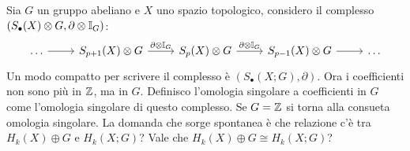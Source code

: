 \eproof
Sia $ G $ un gruppo abeliano e $ X $ uno spazio topologico, considero il complesso
$ (S_\bullet(X) \otimes G, \partial \otimes \mathbb{I}_{G}) $:
\[
  \begin{tikzcd}
    \dots \rar & S_{p+1}(X) \otimes G \rar{\partial \otimes \Id{G}} & S_p(X) \otimes G \rar{\partial \otimes \Id{G}} & S_{p-1}(X) \otimes G \rar & \dots
  \end{tikzcd}
\]
Un modo compatto per scrivere il complesso è $ (S_\bullet(X;G), \partial) $. Ora i
coefficienti non sono più in $ \mathbb{Z} $, ma in $ G $. Definisco l'omologia singolare
a coefficienti in $ G $ come l'omologia singolare di questo complesso. Se
$ G = \mathbb{Z} $ si torna alla consueta omologia singolare. La domanda che sorge spontanea è
che relazione c'è tra $ H_k(X) \oplus G $ e $ H_k(X;G) $? Vale che $ H_k(X) \oplus G \cong H_k(X;G) $?

